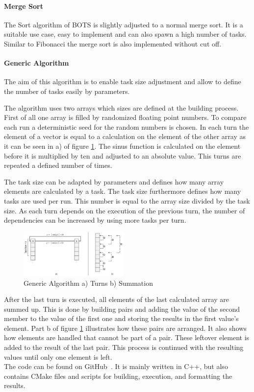   \paragraph{Merge Sort}
  The Sort algorithm of BOTS is slightly adjusted to a normal merge sort.
  It is a suitable use case, easy to implement and can also spawn a high number of tasks.
  Similar to Fibonacci the merge sort is also implemented without cut off. 
  \\
  
  \paragraph{Generic Algorithm}
  The aim of this algorithm is to enable task size adjustment and allow to define the number of tasks easily by parameters.
  
  The algorithm uses two arrays which sizes are defined at the building process.
  First of all one array is filled by randomized floating point numbers.
  To compare each run a deterministic seed for the random numbers is chosen.
  In each turn the element of a vector is equal to a calculation on the element of the other array as it can be seen in a) of figure \ref{fig:gen_algo}.
  The sinus function is calculated on the element before it is multiplied by ten and adjusted to an absolute value.
  This turns are repeated a defined number of times.
  
  The task size can be adapted by parameters and defines how many array elements are calculated by a task.
  The task size furthermore defines how many tasks are used per run.
  This number is equal to the array size divided by the task size.
  As each turn depends on the execution of the previous turn, the number of dependencies can be increased by using more tasks per turn.
    
\begin{figure}[htbp]
	\centering
	\includegraphics[width=0.48\textwidth]{figures/generic_alorithm.PNG}
	\caption{Generic Algorithm a) Turns b) Summation}
	\label{fig:gen_algo}
\end{figure}

  After the last turn is executed, all elements of the last calculated array are summed up.
  This is done by building pairs and adding the value of the second member to the value of the first one and storing the results in the first value's element.
  Part b of figure \ref{fig:gen_algo} illustrates how these pairs are arranged.
  It also shows how elements are handled that cannot be part of a pair.
  These leftover element is added to the result of the last pair.
  This process is continued with the resulting values until only one element is left.
\\

The code can be found on GitHub~\cite{t0BEE.2020}.
It is mainly written in C++, but also contains CMake files and scripts for building, execution, and formatting the results.
